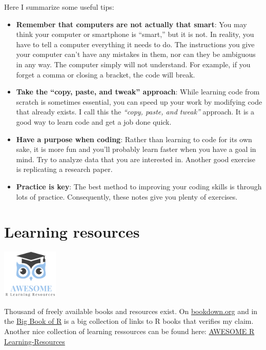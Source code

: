 \documentclass[
  12pt,
  oneside]{book}
\providecommand{\tightlist}{%
  \setlength{\itemsep}{0pt}\setlength{\parskip}{0pt}}
\begin{document}
Here I summarize some useful tips:

\begin{itemize}
\tightlist
\item
  \textbf{Remember that computers are not actually that smart}: You may think your computer or smartphone is ``smart,'' but it is not. In reality, you have to tell a computer everything it needs to do. The instructions you give your computer can't have any mistakes in them, nor can they be ambiguous in any way. The computer simply will not understand. For example, if you forget a comma or closing a bracket, the code will break.
\item
  \textbf{Take the ``copy, paste, and tweak'' approach}: While learning code from scratch is sometimes essential, you can speed up your work by modifying code that already exists. I call this the \emph{``copy, paste, and tweak''} approach. It is a good way to learn code and get a job done quick.\\
\item
  \textbf{Have a purpose when coding}: Rather than learning to code for its own sake, it is more fun and you'll probably learn faster when you have a goal in mind. Try to analyze data that you are interested in. Another good exercise is replicating a research paper.
\item
  \textbf{Practice is key}: The best method to improving your coding skills is through lots of practice. Consequently, these notes give you plenty of exercises.
\end{itemize}

\hypertarget{Rlearninglit}{%
\section{Learning resources}\label{Rlearninglit}}

\includegraphics[width=0.2\textwidth,height=\textheight]{fig/aweres.png}

Thousand of freely available books and resources exist. On \href{https://bookdown.org}{bookdown.org} and in the \href{www.bigbookofr.com}{Big Book of R} is a big collection of links to R books that verifies my claim. Another nice collection of learning ressources can be found here:
\href{https://github.com/iamericfletcher/awesome-r-learning-resources}{AWESOME R Learning-Resources}
\end{document}
